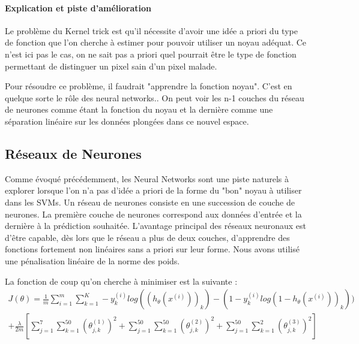 \documentclass[a4paper,10pt]{report}
\begin{document}
\paragraph{Explication et piste d'amélioration}
Le problème du Kernel trick est qu'il nécessite d'avoir une idée a priori du type de fonction que l'on cherche à estimer pour pouvoir utiliser un noyau adéquat. Ce n'est ici pas le cas, on ne sait pas a priori quel pourrait être le type de fonction permettant de distinguer un pixel sain d'un pixel malade.

Pour résoudre ce problème, il faudrait "apprendre la fonction noyau". C'est en quelque sorte le rôle des neural networks.. On peut voir les n-1 couches du réseau de neurones comme étant la fonction du noyau et la dernière comme une séparation linéaire sur les données plongées dans ce nouvel espace.

\subsection{Réseaux de Neurones}

Comme évoqué précédemment, les Neural Networks sont une piste naturels à explorer lorsque l’on n’a pas d'idée a priori de la forme du "bon" noyau à utiliser dans les SVMs. Un réseau de neurones consiste en une succession de couche de neurones. La première couche de neurones correspond aux données d'entrée et la dernière à la prédiction souhaitée. L'avantage principal des réseaux neuronaux est d'être capable, dès lors que le réseau a plus de deux couches, d'apprendre des fonctions fortement non linéaires sans a priori sur leur forme. Nous avons utilisé une pénalisation linéaire de la norme des poids. 

La fonction de coup qu'on cherche à minimiser est la suivante :
\begin{equation}
\begin{split} 
J(\theta)= \frac{1}{m} \sum_{i=1}^m \sum_{k=1}^K -y_k^{(i)} log((h_{\theta}(x^{(i)}))_k) - (1 - y_k^{(i)}log(1 - h_{\theta}(x^{(i)}))_k))\\
 + \frac{\lambda}{2m}[\sum_{j=1}^7\sum_{k=1}^{50}(\theta_{j,k}^{(1)})^2 + \sum_{j=1}^{50}\sum_{k=1}^{50}(\theta_{j,k}^{(2)})^2 + \sum_{j=1}^{50}\sum_{k=1}^2(\theta_{j,k}^{(3)})^2]
\end{split}
\end{equation} 
\end{document}
